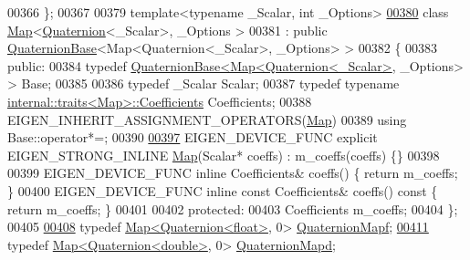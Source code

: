 \begin{DoxyCode}
00366 \};
00367 
00379 \textcolor{keyword}{template}<\textcolor{keyword}{typename} \_Scalar, \textcolor{keywordtype}{int} \_Options>
\hyperlink{group___geometry___module}{00380} \textcolor{keyword}{class }\hyperlink{group___core___module_class_eigen_1_1_map}{Map}<\hyperlink{group___geometry___module_class_eigen_1_1_quaternion}{Quaternion}<\_Scalar>, \_Options >
00381   : \textcolor{keyword}{public} \hyperlink{group___geometry___module_class_eigen_1_1_quaternion_base}{QuaternionBase}<Map<Quaternion<\_Scalar>, \_Options> >
00382 \{
00383   \textcolor{keyword}{public}:
00384     \textcolor{keyword}{typedef} \hyperlink{group___geometry___module_class_eigen_1_1_quaternion_base}{QuaternionBase<Map<Quaternion<\_Scalar>}, \_Options> > Base;
00385 
00386     \textcolor{keyword}{typedef} \_Scalar Scalar;
00387     \textcolor{keyword}{typedef} \textcolor{keyword}{typename} \hyperlink{struct_eigen_1_1internal_1_1traits}{internal::traits<Map>::Coefficients} Coefficients;
00388     EIGEN\_INHERIT\_ASSIGNMENT\_OPERATORS(\hyperlink{group___core___module_class_eigen_1_1_map}{Map})
00389     \textcolor{keyword}{using} Base::operator*=;
00390 
\hyperlink{group___geometry___module_ad94fc6daefd48cccb87aef782e0949e5}{00397}     EIGEN\_DEVICE\_FUNC \textcolor{keyword}{explicit} EIGEN\_STRONG\_INLINE \hyperlink{group___geometry___module_ad94fc6daefd48cccb87aef782e0949e5}{Map}(Scalar* coeffs) : m\_coeffs(coeffs) \{\}
00398 
00399     EIGEN\_DEVICE\_FUNC \textcolor{keyword}{inline} Coefficients& coeffs() \{ \textcolor{keywordflow}{return} m\_coeffs; \}
00400     EIGEN\_DEVICE\_FUNC \textcolor{keyword}{inline} \textcolor{keyword}{const} Coefficients& coeffs()\textcolor{keyword}{ const }\{ \textcolor{keywordflow}{return} m\_coeffs; \}
00401 
00402   \textcolor{keyword}{protected}:
00403     Coefficients m\_coeffs;
00404 \};
00405 
\hyperlink{group___geometry___module_ga7dad770768dc28ad3cee4696841a5dd4}{00408} \textcolor{keyword}{typedef} \hyperlink{group___core___module_class_eigen_1_1_map}{Map<Quaternion<float>}, 0>         \hyperlink{group___geometry___module_ga7dad770768dc28ad3cee4696841a5dd4}{QuaternionMapf};
\hyperlink{group___geometry___module_gac566b934815fa5293437b5d0c065d4e8}{00411} \textcolor{keyword}{typedef} \hyperlink{group___core___module_class_eigen_1_1_map}{Map<Quaternion<double>}, 0>        \hyperlink{group___geometry___module_gac566b934815fa5293437b5d0c065d4e8}{QuaternionMapd};

\end{DoxyCode}
